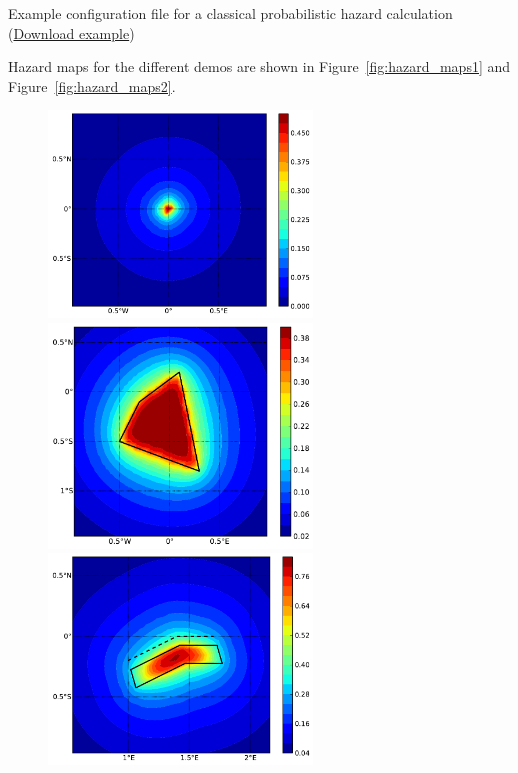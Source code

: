 \begin{listing}[htbp]
  \inputminted[firstline=1,firstnumber=1,fontsize=\footnotesize,frame=single,linenos,bgcolor=lightgray,label=job.ini]{ini}{oqum/hazard/verbatim/config_classical.ini}
  \caption{Example configuration file for a classical probabilistic hazard calculation (\href{https://raw.githubusercontent.com/GEMScienceTools/oq-engine-docs/master/oqum/hazard/verbatim/config_classical.ini}{Download example})}
  \label{lst:config_classical}
\end{listing}

Hazard maps for the different demos are shown in Figure~\ref{fig:hazard_maps1} and Figure~\ref{fig:hazard_maps2}.

\begin{figure}
\centering
\subcaptionbox{}
{\includegraphics[width=7cm]{figures/hazard/point.pdf}}
\subcaptionbox{}
{\includegraphics[width=7cm]{figures/hazard/area.pdf}} 
\subcaptionbox{}
{\includegraphics[width=7cm]{figures/hazard/simple_fault.pdf}} 

\end{figure}
